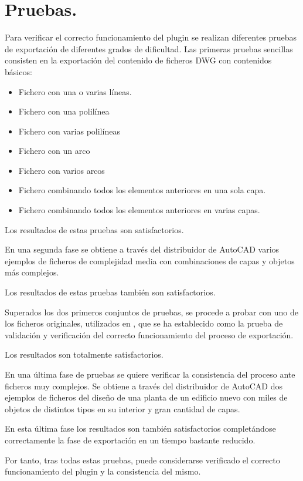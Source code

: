 \section{Pruebas.}

Para verificar el correcto funcionamiento del plugin se realizan diferentes pruebas de exportación de diferentes grados de dificultad. Las primeras pruebas sencillas consisten en la exportación del contenido de ficheros DWG con contenidos básicos:

\begin{itemize}

\item{Fichero con una o varias líneas.}
\item{Fichero con una polilínea}
\item{Fichero con varias polilíneas}
\item{Fichero con un arco}
\item{Fichero con varios arcos}
\item{Fichero combinando todos los elementos anteriores en una sola capa.}
\item{Fichero combinando todos los elementos anteriores en varias capas.}

\end{itemize}

Los resultados de estas pruebas son satisfactorios.

En una segunda fase se obtiene a través del distribuidor de AutoCAD varios ejemplos de ficheros de complejidad media con combinaciones de capas y objetos más complejos.

Los resultados de estas pruebas también son satisfactorios. 

Superados los dos primeros conjuntos de pruebas, se procede a probar con uno de los ficheros originales, utilizados en \cite{Miguel-Munoz}, que se ha establecido como la prueba de validación y verificación del correcto funcionamiento del proceso de exportación. 

Los resultados son totalmente satisfactorios.

En una última fase de pruebas se quiere verificar la consistencia del proceso ante ficheros muy complejos. Se obtiene a través del distribuidor de AutoCAD dos ejemplos de ficheros del diseño de una planta de un edificio nuevo con miles de objetos de distintos tipos en su interior y gran cantidad de capas. 

En esta última fase los resultados son también satisfactorios completándose correctamente la fase de exportación en un tiempo bastante reducido.

Por tanto, tras todas estas pruebas, puede considerarse verificado el correcto funcionamiento del plugin y la consistencia del mismo.